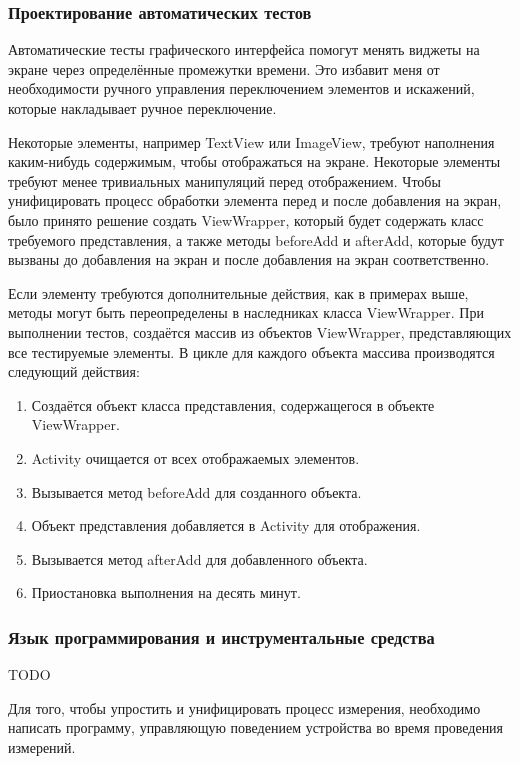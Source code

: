\documentclass[a4paper,14pt]{extarticle} %
\begin{document}
	\subsubsection{Проектирование автоматических тестов}
	
	Автоматические тесты графического интерфейса помогут менять виджеты на экране через определённые промежутки времени. Это избавит меня от необходимости ручного управления переключением элементов и искажений, которые накладывает ручное переключение.
	
	Некоторые элементы, например TextView или ImageView, требуют наполнения каким-нибудь содержимым, чтобы отображаться на экране. Некоторые элементы требуют менее тривиальных манипуляций перед отображением. Чтобы унифицировать процесс обработки элемента перед и после добавления на экран, было принято решение создать ViewWrapper, который будет содержать класс требуемого представления, а также методы beforeAdd и afterAdd, которые будут вызваны до добавления на экран и после добавления на экран соответственно. 
	
	Если элементу требуются дополнительные действия, как в примерах выше, методы могут быть переопределены в наследниках класса ViewWrapper. При выполнении тестов, создаётся массив из объектов ViewWrapper, представляющих все тестируемые элементы. В цикле для каждого объекта массива производятся следующий действия:
	\begin{enumerate}
		\item Создаётся объект класса представления, содержащегося в объекте ViewWrapper.
		\item Activity очищается от всех отображаемых элементов.
		\item Вызывается метод beforeAdd для созданного объекта.
		\item Объект представления добавляется в Activity для отображения.
		\item Вызывается метод afterAdd для добавленного объекта.
		\item Приостановка выполнения на десять минут.
	\end{enumerate}
	
	\subsubsection{Язык программирования и  инструментальные средства}
	
	{\huge TODO}
	
	Для того, чтобы упростить и унифицировать процесс измерения, необходимо написать программу, управляющую поведением устройства во время проведения измерений.
	
\end{document}
